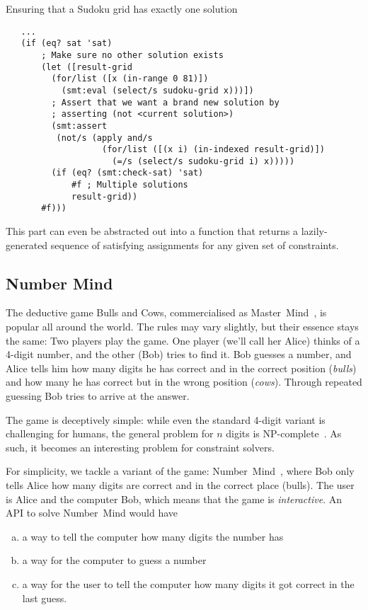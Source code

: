 \begin{program}
\caption{Ensuring that a Sudoku grid has exactly one solution}
\label{fig:sudoku-unique}
\begin{verbatim}
   ...
   (if (eq? sat 'sat)
       ; Make sure no other solution exists
       (let ([result-grid
         (for/list ([x (in-range 0 81)])
           (smt:eval (select/s sudoku-grid x)))])
         ; Assert that we want a brand new solution by
         ; asserting (not <current solution>)
         (smt:assert
          (not/s (apply and/s
                   (for/list ([(x i) (in-indexed result-grid)])
                     (=/s (select/s sudoku-grid i) x)))))
         (if (eq? (smt:check-sat) 'sat)
             #f ; Multiple solutions
             result-grid))
       #f)))
\end{verbatim}
\end{program}

This part can even be abstracted out into a function that returns a
lazily-generated sequence of satisfying assignments for any given set of
constraints.

\subsection{Number Mind}

The deductive game Bulls and Cows, commercialised as
Master~Mind~\cite{mastermind}, is popular all around the world. The rules may
vary slightly, but their essence stays the same: Two players play the game.
One player (we'll call her Alice) thinks of a 4-digit number, and the other
(Bob) tries to find it. Bob guesses a number, and Alice tells him how many
digits he has correct and in the correct position (\textit{bulls}) and how
many he has correct but in the wrong position (\textit{cows}). Through
repeated guessing Bob tries to arrive at the answer.

The game is deceptively simple: while even the standard 4-digit variant is
challenging for humans, the general problem for $n$ digits is
NP-complete~\cite{mastermindnpc}. As such, it becomes an interesting problem for
constraint solvers.

For simplicity, we tackle a variant of the game:
Number~Mind~\cite{numbermind}, where Bob only tells Alice how many digits are
correct and in the correct place (bulls). The user is Alice and the computer
Bob, which means that the game is \textit{interactive}. An API to solve
Number~Mind would have

\begin{enumerate}[(a)]
\item a way to tell the computer how many digits the number has
\item a way for the computer to guess a number
\item a way for the user to tell the computer how many digits it got correct
  in the last guess.
\end{enumerate}

